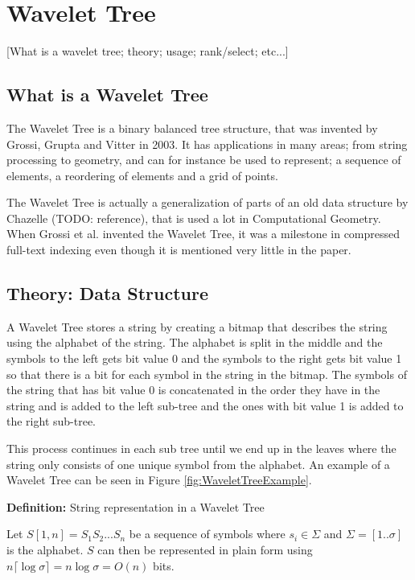 \section{Wavelet Tree}

[What is a wavelet tree; theory; usage; rank/select; etc...]

\subsection{What is a Wavelet Tree}
The Wavelet Tree is a binary balanced tree structure, that was invented by Grossi, Grupta and Vitter \citep{Grossi:2003:HET:644108.644250} in 2003. It has applications in many areas; from string processing to geometry, and can for instance be used to represent; a sequence of elements, a reordering of elements and a grid of points. 

The Wavelet Tree is actually a generalization of parts of an old data structure by Chazelle (TODO: reference), that is used a lot in Computational Geometry. When Grossi et al. invented the Wavelet Tree, it was a milestone in compressed full-text indexing even though it is mentioned very little in the paper.

\subsection{Theory: Data Structure}
A Wavelet Tree stores a string by creating a bitmap that describes the string using the alphabet of the string. The alphabet is split in the middle and the symbols to the left gets bit value 0 and the symbols to the right gets bit value 1 so that there is a bit for each symbol in the string in the bitmap. The symbols of the string that has bit value 0 is concatenated in the order they have in the string and is added to the left sub-tree and the ones with bit value 1 is added to the right sub-tree. 

This process continues in each sub tree until we end up in the leaves where the string only consists of one unique symbol from the alphabet. An example of a Wavelet Tree can be seen in Figure \ref{fig:WaveletTreeExample}.

\begin{mdframed}[nobreak]
\textbf{Definition:} String representation in a Wavelet Tree

Let $S[1,n] = S_1 S_2 ... S_n$ be a sequence of symbols where $s_i \in \Sigma$ and $\Sigma = [1 .. \sigma]$ is the alphabet. $S$ can then be represented in plain form using $n \lceil \log \sigma \rceil = n \log \sigma = O(n)$ bits.
\end{mdframed}


